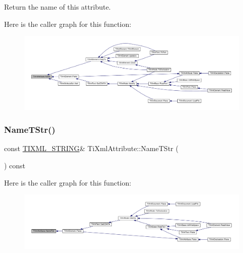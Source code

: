 Return the name of this attribute. 

Here is the caller graph for this function\+:
\nopagebreak
\begin{figure}[H]
\begin{center}
\leavevmode
\includegraphics[width=350pt]{class_ti_xml_attribute_a008ef948268ee752b58c60d63d84bb01_icgraph}
\end{center}
\end{figure}
\mbox{\label{class_ti_xml_attribute_a2bd49ec37463a0a2d081e6587f8b89b8}} 
\subsubsection{\texorpdfstring{Name\+T\+Str()}{NameTStr()}}
{\footnotesize\ttfamily const \hyperlink{tinyxml_8h_a92bada05fd84d9a0c9a5bbe53de26887}{T\+I\+X\+M\+L\+\_\+\+S\+T\+R\+I\+NG}\& Ti\+Xml\+Attribute\+::\+Name\+T\+Str (\begin{DoxyParamCaption}{ }\end{DoxyParamCaption}) const\hspace{0.3cm}{\ttfamily [inline]}}

Here is the caller graph for this function\+:
\nopagebreak
\begin{figure}[H]
\begin{center}
\leavevmode
\includegraphics[width=350pt]{class_ti_xml_attribute_a2bd49ec37463a0a2d081e6587f8b89b8_icgraph}
\end{center}
\end{figure}
\mbox{\label{class_ti_xml_attribute_af2e78f1ba9ed56a26ddc80614ed1c393}} 
